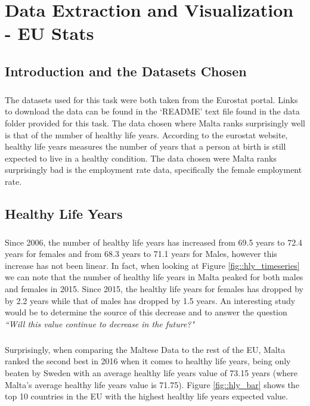 \chapter{Data Extraction and Visualization - EU Stats}

\section{Introduction and the Datasets Chosen}
\paragraph{ }The datasets used for this task were both taken from the Eurostat portal. Links to download the data can be found in the `README' text file found in the data folder provided for this task. The data chosen where Malta ranks surprisingly well is that of the number of healthy life years. According to the eurostat website, healthy life years measures the number of years that a person at birth is still expected to live in a healthy condition. The data chosen were Malta ranks surprisingly bad is the employment rate data, specifically the female employment rate.

\section{Healthy Life Years}
\paragraph{ }Since 2006, the number of healthy life years has increased from 69.5 years to 72.4 years for females and from 68.3 years to 71.1 years for Males, however this increase has not been linear. In fact, when looking at Figure \ref{fig::hly_timeseries} we can note that the number of healthy life years in Malta peaked for both males and females in 2015. Since 2015, the healthy life years for females has dropped by by 2.2 years while that of males has dropped by 1.5 years. An interesting study would be to determine the source of this decrease and to answer the question \textit{``Will this value continue to decrease in the future?"} 

\paragraph{ }Surprisingly, when comparing the Maltese Data to the rest of the EU, Malta ranked the second best in 2016 when it comes to healthy life years, being only beaten by Sweden with an average healthy life years value of 73.15 years (where Malta's average healthy life years value is 71.75). Figure \ref{fig::hly_bar} shows the top 10 countries in the EU with the highest healthy life years expected value.

